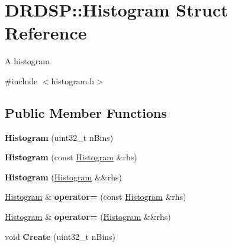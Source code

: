 \hypertarget{struct_d_r_d_s_p_1_1_histogram}{\section{D\-R\-D\-S\-P\-:\-:Histogram Struct Reference}
\label{struct_d_r_d_s_p_1_1_histogram}
}


A histogram.  




{\ttfamily \#include $<$histogram.\-h$>$}

\subsection*{Public Member Functions}
\begin{DoxyCompactItemize}
\item 
\hypertarget{struct_d_r_d_s_p_1_1_histogram_aa66e25090948ef3e66fa909cd6c7137e}{{\bfseries Histogram} (uint32\-\_\-t n\-Bins)}\label{struct_d_r_d_s_p_1_1_histogram_aa66e25090948ef3e66fa909cd6c7137e}

\item 
\hypertarget{struct_d_r_d_s_p_1_1_histogram_abf0cc7d7101cead5c2fcacfa5ab6e432}{{\bfseries Histogram} (const \hyperlink{struct_d_r_d_s_p_1_1_histogram}{Histogram} \&rhs)}\label{struct_d_r_d_s_p_1_1_histogram_abf0cc7d7101cead5c2fcacfa5ab6e432}

\item 
\hypertarget{struct_d_r_d_s_p_1_1_histogram_a16a59db9ef1ba1e02d57afb81ed2d05c}{{\bfseries Histogram} (\hyperlink{struct_d_r_d_s_p_1_1_histogram}{Histogram} \&\&rhs)}\label{struct_d_r_d_s_p_1_1_histogram_a16a59db9ef1ba1e02d57afb81ed2d05c}

\item 
\hypertarget{struct_d_r_d_s_p_1_1_histogram_a32e47b8a29cd3e658a1b44e1c6253460}{\hyperlink{struct_d_r_d_s_p_1_1_histogram}{Histogram} \& {\bfseries operator=} (const \hyperlink{struct_d_r_d_s_p_1_1_histogram}{Histogram} \&rhs)}\label{struct_d_r_d_s_p_1_1_histogram_a32e47b8a29cd3e658a1b44e1c6253460}

\item 
\hypertarget{struct_d_r_d_s_p_1_1_histogram_a3f705b4ad8eafb893a760abf7a55dcfe}{\hyperlink{struct_d_r_d_s_p_1_1_histogram}{Histogram} \& {\bfseries operator=} (\hyperlink{struct_d_r_d_s_p_1_1_histogram}{Histogram} \&\&rhs)}\label{struct_d_r_d_s_p_1_1_histogram_a3f705b4ad8eafb893a760abf7a55dcfe}

\item 
\hypertarget{struct_d_r_d_s_p_1_1_histogram_a11252e6e91d54a93766eab33756e46fd}{void {\bfseries Create} (uint32\-\_\-t n\-Bins)}\label{struct_d_r_d_s_p_1_1_histogram_a11252e6e91d54a93766eab33756e46fd}


\end{DoxyCompactItemize}
